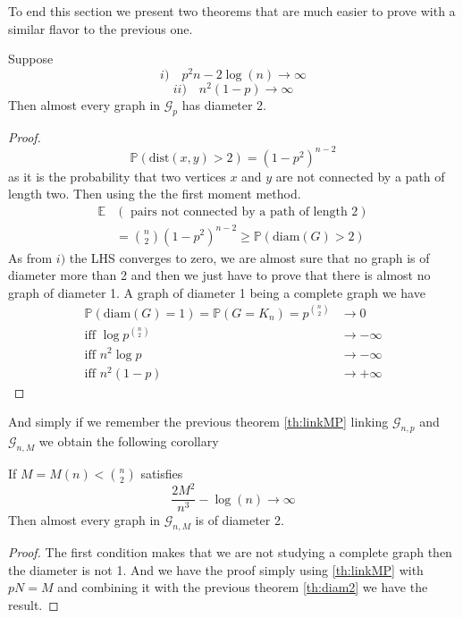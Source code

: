\newline
	To end this section we present two theorems that are much easier to prove with a similar flavor to the previous one.
	\begin{theorem}\label{th:diam2}
	Suppose 
	\begin{equation}
		i) \quad p^2n - 2\log(n) \longrightarrow \infty
	\end{equation}
	\begin{equation}
		ii) \quad n^2(1-p) \longrightarrow \infty
	\end{equation}
	Then almost every graph in $\mathcal{G}_p$ has diameter 2.
\end{theorem}

\begin{proof}
	\begin{equation}
		\mathbb{P}(\text{dist}(x, y) > 2) = (1-p^2)^{n-2}
	\end{equation}
	as it is the probability that two vertices $x$ and $y$ are not connected by a path of length two.
	\newline
	Then using the the first moment method.
	\begin{align}
		\mathbb{E}&(\text{ pairs not connected by a path of length 2})	\\
				&= \binom{n}{2}(1-p^2)^{n-2} \geq \mathbb{P}(\text{diam}(G) > 2)
	\end{align}
	As from $i)$ the LHS converges to zero, we are almost sure that no graph is of diameter more than 2 and then we just have to prove that there is almost no graph of diameter 1.
	A graph of diameter 1 being a complete graph we have
	\begin{align}
		\mathbb{P}(\text{diam}(G) = 1) = \mathbb{P}(G = K_n) 	
				= p^{\binom{n}{2}} &\longrightarrow 0				\\
		\text{iff  } \log p^{\binom{n}{2}} &\longrightarrow -\infty			\\
			   \text{iff  } n^2 \log p &\longrightarrow -\infty			\\
			    \text{iff  } n^2 (1-p) &\longrightarrow +\infty			
	\end{align}	
\end{proof}
And simply if we remember the previous theorem \ref{th:linkMP} linking $\mathcal{G}_{n,p}$ and $\mathcal{G}_{n,M}$ we obtain the following corollary

\begin{corollary}
	If $M=M(n) < \binom{n}{2}$ satisfies 
	\begin{equation}
		\frac{2M^2}{n^3} - \log(n) \longrightarrow \infty
	\end{equation}
	Then almost every graph in $\mathcal{G}_{n, M}$ is of diameter 2.
\end{corollary}
\begin{proof}
	The first condition makes that we are not studying a complete graph then the diameter is not 1.
	And we have the proof simply using \ref{th:linkMP} with $pN = M$ and combining it with the previous theorem \ref{th:diam2} we have the result.
\end{proof}

